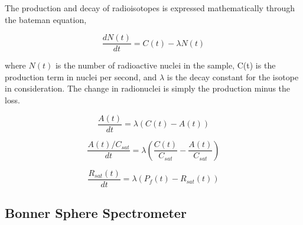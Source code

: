 The production and decay of radioisotopes is expressed mathematically through the bateman equation,

\begin{equation}
\label{eqn:bateman}
\frac{dN(t)}{dt} = C(t) - \lambda N(t)
\end{equation}

where $N(t)$ is the number of radioactive nuclei in the sample, C(t) is the production term in nuclei per second, and $\lambda$ is the decay constant for the isotope in consideration. The change in radionuclei is simply the production minus the loss.

\begin{equation}
\label{eqn:bateman_activity}
\frac{A(t)}{dt} = \lambda (C(t) - A(t))
\end{equation}

\begin{equation}
\label{eqn:bateman_ratios}
\frac{A(t) / C_{sat}}{dt} = \lambda (\frac{C(t)}{C_{sat}} - \frac{A(t)}{C_{sat}})
\end{equation}

\begin{equation}
\label{eqn:bateman_r_sat}
\frac{R_{sat}(t)}{dt} = \lambda (P_{f}(t) - R_{sat}(t))
\end{equation}



\subsection{Bonner Sphere Spectrometer}





